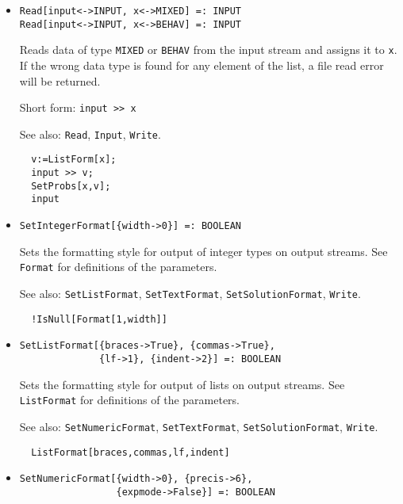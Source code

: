 \begin{itemize}
\item{}
\protect \large \begin{verbatim}
Read[input<->INPUT, x<->MIXED] =: INPUT 
Read[input<->INPUT, x<->BEHAV] =: INPUT 
\end{verbatim}\normalsize

\bd 
Reads data of type \verb+MIXED+ or \verb+BEHAV+ from the input
stream and assigns it to \verb+x+.  If the wrong data type is found
for any element of the list, a file read error will be returned.
\item [Short form:] \verb+input >> x+
\item [See also:] \verb+Read+, \verb+Input+, \verb+Write+.
\begin{verbatim}
  v:=ListForm[x];
  input >> v;
  SetProbs[x,v];
  input
\end{verbatim} 
\ed


\item{}
\protect \large \begin{verbatim}
SetIntegerFormat[{width->0}] =: BOOLEAN 
\end{verbatim}\normalsize

\bd 
Sets the formatting style for output of integer types on output
streams.  See \verb+Format+ for definitions of the parameters.
\item [See also:] \verb+SetListFormat+, \verb+SetTextFormat+, 
\verb+SetSolutionFormat+, \verb+Write+.
\begin{verbatim}
  !IsNull[Format[1,width]]
\end{verbatim} 
\ed

\item{}
\protect \large \begin{verbatim}
SetListFormat[{braces->True}, {commas->True}, 
              {lf->1}, {indent->2}] =: BOOLEAN 
\end{verbatim} \normalsize

\bd
Sets the formatting style for output of lists on output streams. See
\verb+ListFormat+ for definitions of the parameters. 
\item [See also:] \verb+SetNumericFormat+, \verb+SetTextFormat+,
\verb+SetSolutionFormat+, \verb+Write+.
\begin{verbatim}
  ListFormat[braces,commas,lf,indent]
\end{verbatim} 
\ed

\item{}
\protect \large \begin{verbatim}
SetNumericFormat[{width->0}, {precis->6}, 
                 {expmode->False}] =: BOOLEAN 
\end{verbatim}\normalsize


\end{itemize}
